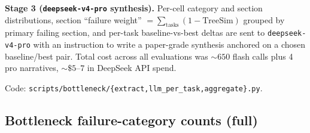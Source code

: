\documentclass{article}
\begin{document}
\textbf{Stage 3 (\texttt{deepseek-v4-pro} synthesis).} Per-cell category and section distributions, section ``failure weight'' $= \sum_{\mathrm{tasks}}(1 - \mathrm{TreeSim})$ grouped by primary failing section, and per-task baseline-vs-best deltas are sent to \texttt{deepseek-v4-pro} with an instruction to write a paper-grade synthesis anchored on a chosen baseline/best pair. Total cost across all evaluations was ${\sim}650$ flash calls plus 4 pro narratives, ${\sim}\$5\text{--}7$ in DeepSeek API spend.

Code: \texttt{scripts/bottleneck/\{extract,llm\_per\_task,aggregate\}.py}.

\subsection{Bottleneck failure-category counts (full)}
\label{app:bottleneck-counts}

\begin{table}[h]
  \caption{Failure-category counts per cell; categories with all-zero or unreported counts (\texttt{no\_failure}, \texttt{wrong\_constitutive}) are omitted. val panel uses $n=51$ tasks per cell ($3{\times}17$); held-out-eval panel uses $n=29$--$30$ per cell ($3{\times}10$ minus a small number of LLM-judge parse-failures).}
  \label{tab:bottleneck}
  \centering
  \footnotesize
\end{table}
\end{document}

